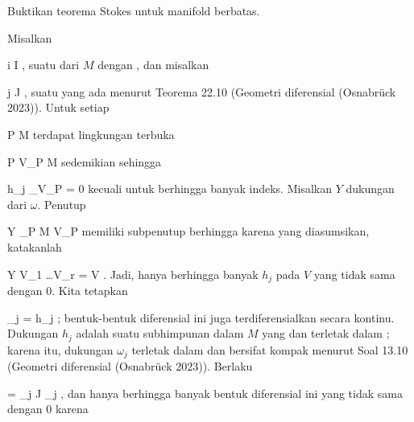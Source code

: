 {

Buktikan teorema Stokes untuk manifold berbatas.

}
{

\teilbeweis {}{}{}
{Misalkan

 {}
 {i \in I} {}
 {} {} {} {,}
suatu
dari $M$ dengan
,
dan misalkan

 {}
 {j \in J} {}
 {} {} {} {,}
suatu
yang ada menurut
Teorema 22.10 (Geometri diferensial (Osnabrück 2023)).
Untuk setiap

\mavergleichskette
{\vergleichskette
{ P
}
{ \in }{ M
}
{  }{
}
{    }{
}
{   }{
}
}
{}{}{}
terdapat lingkungan terbuka

\mavergleichskette
{\vergleichskette
{ P
}
{ \in }{ V_P
}
{ \subseteq }{ M
}
{    }{
}
{   }{
}
}
{}{}{}
sedemikian sehingga

\mavergleichskette
{\vergleichskette
{ h_j \vert_{V_P }
}
{ = }{ 0
}
{  }{
}
{    }{
}
{   }{
}
}
{}{}{}
kecuali untuk berhingga banyak indeks. Misalkan $Y$ dukungan dari $\omega$. Penutup

\mavergleichskette
{\vergleichskette
{ Y
}
{ \subseteq }{ \bigcup_{P \in M} V_P
}
{  }{
}
{    }{
}
{   }{
}
}
{}{}{}
memiliki subpenutup berhingga karena
yang diasumsikan, katakanlah

\mavergleichskettedisp
{\vergleichskette
{ Y
}
{ \subseteq} { V_{1} \cup \ldots \cup V_{r}
}
{ =} { V
}
{ } {
}
{ } {
}
}
{}{}{.}
Jadi, hanya berhingga banyak $h_j$ pada $V$ yang tidak sama dengan $0$. Kita tetapkan

\mavergleichskette
{\vergleichskette
{ \omega_j
}
{ = }{ h_j \omega
}
{  }{
}
{    }{
}
{   }{
}
}
{}{}{;}
bentuk-bentuk diferensial ini juga terdiferensialkan secara kontinu. Dukungan $h_j$ adalah suatu subhimpunan dalam $M$ yang
dan terletak dalam
; karena itu, dukungan $\omega_j$ terletak dalam
 dan bersifat kompak menurut
Soal 13.10 (Geometri diferensial (Osnabrück 2023)).
Berlaku

\mavergleichskettedisp
{\vergleichskette
{ \omega
}
{ =} { \sum_{j \in J} \omega_j
}
{ } {
}
{ } {
}
{ } {
}
}
{}{}{,}
dan hanya berhingga banyak bentuk diferensial
 ini yang tidak sama dengan $0$ karena

}}
